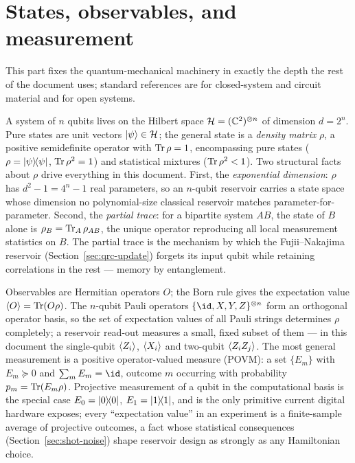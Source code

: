
\section{States, observables, and measurement}
\label{sec:quantum-states}

This part fixes the quantum-mechanical machinery in exactly the depth the rest
of the document uses; standard references are
\citet{nielsen2010quantum} for closed-system and circuit material and
\citet{breuer2002theory} for open systems.

A system of $n$ qubits lives on the Hilbert space
$\mathcal{H} = (\mathbb{C}^2)^{\otimes n}$ of dimension $d = 2^n$. Pure states are unit
vectors $|\psi\rangle \in \mathcal{H}$; the general state is a \emph{density matrix}
$\rho$, a positive semidefinite operator with $\operatorname{Tr}\rho = 1$, encompassing pure
states ($\rho = |\psi\rangle\!\langle\psi|$, $\operatorname{Tr}\rho^2 = 1$) and statistical
mixtures ($\operatorname{Tr}\rho^2 < 1$). Two structural facts about $\rho$ drive everything
in this document. First, the \emph{exponential dimension}: $\rho$ has
$d^2 - 1 = 4^n - 1$ real parameters, so an $n$-qubit reservoir carries a state
space whose dimension no polynomial-size classical reservoir matches
parameter-for-parameter. Second, the \emph{partial trace}: for a bipartite
system $AB$, the state of $B$ alone is $\rho_B = \operatorname{Tr}_A \rho_{AB}$, the unique
operator reproducing all local measurement statistics on $B$. The partial
trace is the mechanism by which the Fujii--Nakajima reservoir
(Section~\ref{sec:qrc-update}) forgets its input qubit while retaining
correlations in the rest --- memory by entanglement.

Observables are Hermitian operators $O$; the Born rule gives the expectation
value $\langle O\rangle = \operatorname{Tr}(O\rho)$. The $n$-qubit Pauli operators
$\{ \id, X, Y, Z \}^{\otimes n}$ form an orthogonal operator basis, so the set
of expectation values of all Pauli strings determines $\rho$ completely; a
reservoir read-out measures a small, fixed subset of them --- in this document
the single-qubit $\langle Z_i\rangle$, $\langle X_i\rangle$ and two-qubit $\langle Z_i Z_j\rangle$. The most
general measurement is a positive operator-valued measure (POVM): a set
$\{E_m\}$ with $E_m \succeq 0$ and $\sum_m E_m = \id$, outcome $m$ occurring
with probability $p_m = \operatorname{Tr}(E_m \rho)$. Projective measurement of a qubit in
the computational basis is the special case $E_0 = |0\rangle\!\langle0|$,
$E_1 = |1\rangle\!\langle1|$, and is the only primitive current digital hardware
exposes; every ``expectation value'' in an experiment is a finite-sample
average of projective outcomes, a fact whose statistical consequences
(Section~\ref{sec:shot-noise}) shape reservoir design as strongly as any
Hamiltonian choice.


